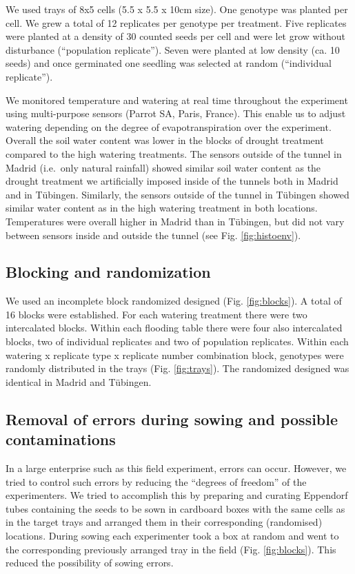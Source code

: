 \documentclass[12pt,]{article}
\begin{document}
We used trays of 8x5 cells (5.5 x 5.5 x 10cm size). One genotype was
planted per cell. We grew a total of 12 replicates per genotype per
treatment. Five replicates were planted at a density of 30 counted seeds
per cell and were let grow without disturbance (``population
replicate''). Seven were planted at low density (ca. 10 seeds) and once
germinated one seedling was selected at random (``individual
replicate'').

We monitored temperature and watering at real time throughout the
experiment using multi-purpose sensors (Parrot SA, Paris, France). This
enable us to adjust watering depending on the degree of
evapotranspiration over the experiment. Overall the soil water content
was lower in the blocks of drought treatment compared to the high
watering treatments. The sensors outside of the tunnel in Madrid
(i.e.~only natural rainfall) showed similar soil water content as the
drought treatment we artificially imposed inside of the tunnels both in
Madrid and in Tübingen. Similarly, the sensors outside of the tunnel in
Tübingen showed similar water content as in the high watering treatment
in both locations. Temperatures were overall higher in Madrid than in
Tübingen, but did not vary between sensors inside and outside the tunnel
(see Fig. \ref{fig:histoenv}).

\subsection{Blocking and
randomization}\label{blocking-and-randomization}

We used an incomplete block randomized designed (Fig. \ref{fig:blocks}).
A total of 16 blocks were established. For each watering treatment there
were two intercalated blocks. Within each flooding table there were four
also intercalated blocks, two of individual replicates and two of
population replicates. Within each watering x replicate type x replicate
number combination block, genotypes were randomly distributed in the
trays (Fig. \ref{fig:trays}). The randomized designed was identical in
Madrid and Tübingen.

\subsection{Removal of errors during sowing and possible
contaminations}\label{removal-of-errors-during-sowing-and-possible-contaminations}

In a large enterprise such as this field experiment, errors can occur.
However, we tried to control such errors by reducing the ``degrees of
freedom'' of the experimenters. We tried to accomplish this by preparing
and curating Eppendorf tubes containing the seeds to be sown in
cardboard boxes with the same cells as in the target trays and arranged
them in their corresponding (randomised) locations. During sowing each
experimenter took a box at random and went to the corresponding
previously arranged tray in the field (Fig. \ref{fig:blocks}). This
reduced the possibility of sowing errors.
\end{document}
